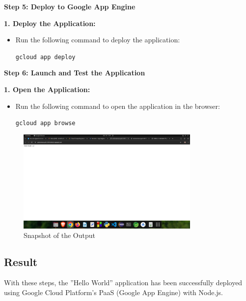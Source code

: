 \documentclass[12pt]{article}
\begin{document}
\begin{spacing}{1.5}
\begin{adjustwidth}{0cm}{0cm}
\begin{justify}
\textbf{Step 5: Deploy to Google App Engine}

\textbf{1. Deploy the Application:}
\begin{itemize}
    \item Run the following command to deploy the application:
    \begin{center}
    \texttt{gcloud app deploy}
    \end{center}
\end{itemize}

\textbf{Step 6: Launch and Test the Application}

\textbf{1. Open the Application:}
\begin{itemize}
    \item Run the following command to open the application in the browser:
    \begin{center}
    \texttt{gcloud app browse}
    \end{center}
\end{itemize}

\begin{figure}[H]
    \centering
    \includegraphics[width=0.8\textwidth]{exp 5/s35.png}
    \caption{Snapshot of the Output}
    \label{fig: 1}
\end{figure}

\subsection{Result} 
With these steps, the ”Hello World” application has been successfully deployed using
Google Cloud Platform’s PaaS (Google App Engine) with Node.js.


\newpage






\end{justify}
\end{adjustwidth}
\end{spacing}
\end{document}
